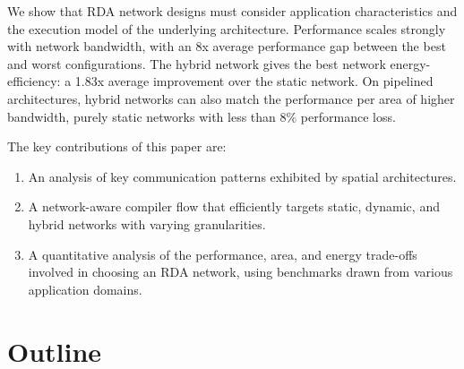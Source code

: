 We show that RDA network designs must consider application characteristics and the execution model of the underlying architecture.
Performance scales strongly with network bandwidth, with an 8x average performance gap between the best and worst configurations. 
The hybrid network gives the best network energy-efficiency: a 1.83x average improvement over the static network. On pipelined architectures,
hybrid networks can also match the performance per area of higher bandwidth, purely static networks with less than 8\% performance loss.

The key contributions of this paper are:
\begin{enumerate}
    \item An analysis of key communication patterns exhibited by spatial architectures.
    \item A network-aware compiler flow that efficiently targets static, dynamic, and hybrid networks with varying granularities.
    \item A quantitative analysis of the performance, area, and energy trade-offs involved in choosing an RDA network, using benchmarks drawn from various application domains.
\end{enumerate}

\section{Outline}

